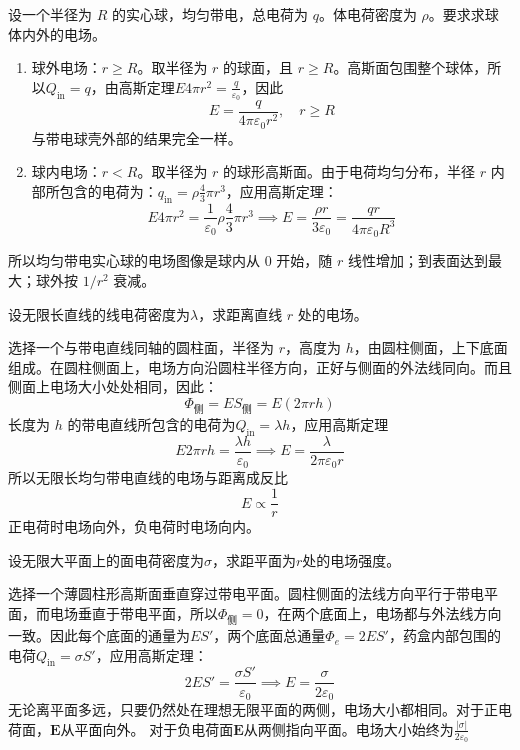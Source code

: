 \documentclass[lang=cn,11pt]{elegantbook}
\begin{document}
\begin{exercise}
设一个半径为 \(R\) 的实心球，均匀带电，总电荷为 \(q\)。体电荷密度为 \(\rho\)。要求求球体内外的电场。
\end{exercise}
\begin{solution}
\begin{enumerate}
  \item 球外电场：\(r\ge R\)。取半径为 \(r\) 的球面，且 \(r\ge R\)。高斯面包围整个球体，所以\(Q_{\mathrm{in}}=q\)，由高斯定理\(E4\pi r^2=\frac q{\varepsilon_0}\)，因此
\[\boxed{E=\frac q{4\pi\varepsilon_0r^2},\quad r\ge R}\]与带电球壳外部的结果完全一样。
\item 球内电场：\(r<R\)。取半径为 \(r\) 的球形高斯面。由于电荷均匀分布，半径 \(r\) 内部所包含的电荷为：\(q_{\mathrm{in}}=\rho\frac43\pi r^3\)，应用高斯定理：
\[E4\pi r^2=\frac1{\varepsilon_0}\rho\frac43\pi r^3\implies E=\frac{\rho r}{3\varepsilon_0}=\frac{qr}{4\pi\varepsilon_0R^3}\]
\end{enumerate}
所以均匀带电实心球的电场图像是球内从 0 开始，随 \(r\) 线性增加；到表面达到最大；球外按 \(1/r^2\) 衰减。
\end{solution}


\begin{exercise}
设无限长直线的线电荷密度为\(\lambda\)，求距离直线 \(r\) 处的电场。
\end{exercise}
\begin{solution}
选择一个与带电直线同轴的圆柱面，半径为 \(r\)，高度为 \(h\)，由圆柱侧面，上下底面组成。在圆柱侧面上，电场方向沿圆柱半径方向，正好与侧面的外法线同向。而且侧面上电场大小处处相同，因此：
\[
\Phi_{\text{侧}}=ES_{\text{侧}}=E(2\pi rh)
\]长度为 \(h\) 的带电直线所包含的电荷为\(Q_{\mathrm{in}}=\lambda h\)，应用高斯定理\[E2\pi rh
=\frac{\lambda h}{\varepsilon_0}\implies E=\frac{\lambda}{2\pi\varepsilon_0 r}\]所以无限长均匀带电直线的电场与距离成反比\[E\propto\frac1r\]正电荷时电场向外，负电荷时电场向内。
\end{solution}

\begin{exercise}
设无限大平面上的面电荷密度为$\sigma$，求距平面为$r$处的电场强度。
\end{exercise}
\begin{solution}
选择一个薄圆柱形高斯面垂直穿过带电平面。圆柱侧面的法线方向平行于带电平面，而电场垂直于带电平面，所以\(\Phi_{\text{侧}}=0\)，在两个底面上，电场都与外法线方向一致。因此每个底面的通量为\(ES'\)，两个底面总通量\(\Phi_e=2ES'\)，药盒内部包围的电荷\(Q_{\mathrm{in}}=\sigma S'\)，应用高斯定理：
\[
2ES'=\frac{\sigma S'}{\varepsilon_0}\implies E=\frac{\sigma}{2\varepsilon_0}
\]无论离平面多远，只要仍然处在理想无限平面的两侧，电场大小都相同。对于正电荷面，\(\mathbf E\)从平面向外。
对于负电荷面\(\mathbf E\)从两侧指向平面。电场大小始终为\(\frac{|\sigma|}{2\varepsilon_0}\)
\end{solution}
\end{document}
